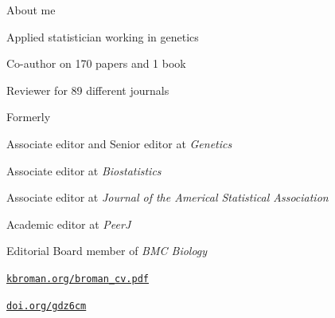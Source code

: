 \documentclass[aspectratio=169,12pt,t]{beamer}
\begin{document}
\begin{frame}{About me}

  \vspace{-12pt}

  \bbi
\item Applied statistician working in genetics
\item Co-author on 170 papers and 1 book
\item Reviewer for 89 different journals
\item Formerly
  \bi
\item Associate editor and Senior editor at \emph{Genetics}
\item Associate editor at \emph{Biostatistics}
\item Associate editor at \emph{Journal of the Americal Statistical
Association}
\item Academic editor at \emph{PeerJ}
\item Editorial Board member of \emph{BMC Biology}
  \ei
  \ei

  \vspace{30pt}
  \hfill
  \href{https://kbroman.org/broman_cv.pdf}{\tt \footnotesize \lolit kbroman.org/broman{\_}cv.pdf}

\end{frame}



\begin{frame}[c]{}

  \vspace{24pt}

  \centerline{}

  \vfill
  \hfill
  \href{https://doi.org/gdz6cm}{\tt \footnotesize \lolit doi.org/gdz6cm}

  \note{
  }
\end{frame}


\begin{frame}[c]{}

  \note{
  }
\end{frame}
\end{document}
